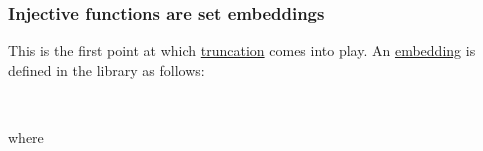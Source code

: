 \subsubsection{Injective functions are set embeddings}\label{injective-functions-are-set-embeddings}
This is the first point at which \href{UALib.Preface.html\#truncation}{truncation} comes into play. An
\href{https://www.cs.bham.ac.uk/~mhe/HoTT-UF-in-Agda-Lecture-Notes/HoTT-UF-Agda.html\#embeddings}{embedding} is defined in the \TypeTopology library as follows:
\ccpad
\begin{code}
\>[0]\AgdaSpace{}%
\AgdaSymbol{:}\AgdaSpace{}%
\AgdaSymbol{\{}\AgdaSpace{}%
\AgdaSymbol{:}\AgdaSpace{}%
\AgdaSpace{}%
\AgdaSpace{}%
\AgdaSymbol{\}}\AgdaSpace{}%
\AgdaSymbol{\{}\AgdaSpace{}%
\AgdaSymbol{:}\AgdaSpace{}%
\AgdaSpace{}%
\AgdaSpace{}%
\AgdaSymbol{\}}\AgdaSpace{}%
\AgdaSpace{}%
\AgdaSymbol{(}\AgdaSpace{}%
\AgdaSpace{}%
\AgdaSymbol{)}\AgdaSpace{}%
\AgdaSpace{}%
\AgdaSpace{}%
\AgdaSpace{}%
\AgdaSpace{}%
\<%
\\
\>[0]\AgdaSpace{}%
\AgdaSpace{}%
\AgdaSymbol{=}\AgdaSpace{}%
\AgdaSymbol{(}\AgdaSpace{}%
\AgdaSymbol{:}\AgdaSpace{}%
\AgdaSpace{}%
\AgdaSymbol{)}\AgdaSpace{}%
\AgdaSpace{}%
\AgdaSpace{}%
\AgdaSymbol{(}\AgdaSpace{}%
\AgdaSpace{}%
\AgdaSymbol{)}\<%
\end{code}
\ccpad
where
\ccpad
\begin{code}
\>[0]\AgdaSpace{}%
\AgdaSymbol{:}\AgdaSpace{}%
\AgdaSpace{}%
\AgdaSpace{}%
\AgdaSpace{}%
\AgdaSpace{}%
\<%
\\
\>[0]\AgdaSpace{}%
\AgdaSpace{}%
\AgdaSymbol{=}\AgdaSpace{}%
\AgdaSymbol{(}\AgdaSpace{}%
\AgdaSpace{}%
\AgdaSymbol{:}\AgdaSpace{}%
\AgdaSymbol{)}\AgdaSpace{}%
\AgdaSpace{}%
\AgdaSpace{}%
\AgdaSpace{}%
\<%
\end{code}
